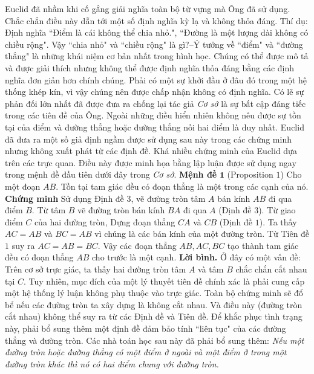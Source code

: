 \begin{multicols}{2}
	Euclid đã nhầm khi cố gắng giải nghĩa toàn bộ từ vựng mà Ông đã sử dụng. Chắc chắn điều này dẫn tới một số định nghĩa kỳ lạ và không thỏa đáng. Thí dụ: Định nghĩa ``Điểm là cái không thể chia nhỏ.", ``Đường là một lượng dài không có chiều rộng". Vậy ``chia nhỏ" và ``chiều rộng" là gì?--Ý tưởng về ``điểm" và ``đường thẳng" là những khái niệm cơ bản nhất trong hình học. Chúng có thể được mô tả và được giải thích nhưng không thể được định nghĩa thỏa đáng bằng các định nghĩa đơn giản hơn chính chúng. Phải có một sự khởi đầu ở đâu đó trong một hệ thống khép kín, vì vậy chúng nên được chấp nhận không có định nghĩa.
	\vskip 0.1cm
	Có lẽ sự phản đối lớn nhất đã được đưa ra chống lại tác giả \textit{Cơ sở} là sự bất cập đáng tiếc trong các tiên đề của Ông. Ngoài những điều hiển nhiên không nêu được sự tồn tại của điểm và đường thẳng hoặc đường thẳng nối hai điểm là duy nhất. Euclid đã đưa ra một số giả định ngầm được sử dụng sau này trong các chứng minh nhưng không xuất phát từ các định đề. Khá nhiều chứng minh của Euclid dựa trên các trực quan. Điều này được minh họa bằng lập luận được sử dụng ngay trong mệnh đề đầu tiên dưới đây trong \textit{Cơ sở}.
	\vskip 0.1cm 
	\textbf{\color{lichsutoanhoc}Mệnh đề} $\pmb{1}$ (Proposition $1$) Cho một đoạn $AB$. Tồn tại tam giác đều có đoạn thẳng là một trong các cạnh của nó.
	\vskip 0.1cm
	\textbf{\color{lichsutoanhoc}Chứng minh} Sử dụng Định đề $3$, vẽ đường tròn tâm $A$ bán kính $AB$ đi qua điểm $B$. Từ tâm $B$ vẽ đường tròn bán kính $BA$ đi qua $A$ (Định đề $3$). Từ giao điểm $C$ của hai đường tròn, Dựng đoạn thẳng $CA$ và $CB$ (Định đề $1$).  Ta thấy $AC=AB$ và $BC=AB$ vì chúng là các bán kính của một đường tròn. Từ Tiên đề $1$ suy ra $AC=AB=BC$. Vậy các đoạn thẳng $AB, AC, BC$ tạo thành tam giác đều có đoạn thẳng $AB$ cho trước là một cạnh.
	\vskip 0.1cm
	\textbf{\color{lichsutoanhoc}Lời bình.} Ở đây có một vấn đề: Trên cơ sở trực giác, ta thấy hai đường tròn tâm $A$ và tâm $B$ chắc chắn cắt nhau tại $C$.  Tuy nhiên, mục đích của một lý thuyết tiên đề chính xác là phải cung cấp một hệ thống lý luận không phụ thuộc vào trực giác. Toàn bộ chứng minh sẽ đổ bể nếu các đường tròn ta xây dựng là không cắt nhau. Và điều này (đường tròn cắt nhau) không thể suy ra từ các Định đề và Tiên đề. Để khắc phục tình trạng này, phải bổ sung thêm một định đề đảm bảo tính ``liên tục" của các đường thẳng và đường tròn. Các nhà toán học sau này đã phải bổ sung thêm:
	\vskip 0.1cm
	\textit{Nếu một đường tròn hoặc đường thẳng có một điểm ở ngoài và một điểm ở trong một đường tròn khác thì nó có hai điểm chung với đường tròn.}
	\vskip 0.1cm 

\end{multicols}
